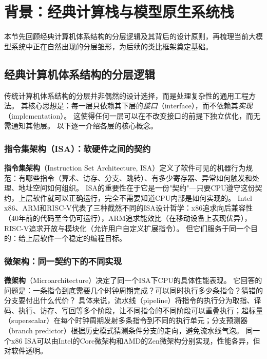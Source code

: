 \section{背景：经典计算栈与模型原生系统栈}
\label{sec:background}

本节先回顾经典计算机体系结构的分层逻辑及其背后的设计原则，再梳理当前大模型系统中正在自然出现的分层雏形，为后续的类比框架奠定基础。

\subsection{经典计算机体系结构的分层逻辑}

传统计算机体系结构的分层并非偶然的设计选择，而是处理复杂性的通用工程方法\cite{hennessy2017quantitative}。
其核心思想是：每一层只依赖其下层的\emph{接口}（interface），而不依赖其\emph{实现}（implementation）。
这使得任何一层可以在不改变接口的前提下独立优化，而无需通知其他层。
以下逐一介绍各层的核心概念。

\subsubsection{指令集架构（ISA）：软硬件之间的契约}

\textbf{指令集架构}（Instruction Set Architecture, ISA）定义了软件可见的机器行为规范：有哪些指令（算术、访存、分支、跳转）、有多少寄存器、异常如何触发和处理、地址空间如何组织。
ISA的重要性在于它是一份"契约"---只要CPU遵守这份契约，上层软件就可以正确运行，完全不需要知道CPU内部是如何实现的。
Intel x86、ARM和RISC-V代表了三种截然不同的ISA设计哲学\cite{intel_sdm_2026,riscv_spec_2026}：x86追求向后兼容性（40年前的代码至今仍可运行），ARM追求能效比（在移动设备上表现优异），RISC-V追求开放与模块化（允许用户自定义扩展指令）。
但它们服务于同一个目的：给上层软件一个稳定的编程目标。

\subsubsection{微架构：同一契约下的不同实现}

\textbf{微架构}（Microarchitecture）决定了同一个ISA下CPU的具体性能表现。
它回答的问题是：一条指令到底需要几个时钟周期完成？可以同时执行多少条指令？猜错的分支要付出什么代价？
具体来说，流水线（pipeline）将指令的执行分为取指、译码、执行、访存、写回等多个阶段，让不同指令的不同阶段可以重叠执行；超标量（superscalar）在每个时钟周期发射多条指令到不同的执行单元；分支预测器（branch predictor）根据历史模式猜测条件分支的走向，避免流水线气泡。
同一个x86 ISA可以由Intel的Core微架构和AMD的Zen微架构分别实现，性能各异，但对软件透明。


